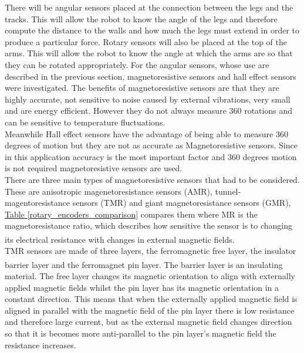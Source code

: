\documentclass[11pt]{article}		%
\newcommand{\supercite}[1]{\textsuperscript{\cite{#1}}}		%
\newcommand{\tableref}[1]{\hyperref[#1]{Table \ref*{#1}}}     %
\begin{document}
            There will be angular sensors placed at the connection between the legs and the tracks. 
            This will allow the robot to know the angle of the legs and therefore compute the distance to the walls and how much the legs must extend in order to produce a particular force. 
            Rotary sensors will also be placed at the top of the arms. 
            This will allow the robot to know the angle at which the arms are so that they can be rotated appropriately. 
            For the angular sensors, whose use are described in the previous section, magnetoresistive sensors and hall effect sensors were investigated. 
            The benefits of magnetoresistive sensors are that they are highly accurate, not sensitive to noise caused by external vibrations, very small and are energy efficient.
            However they do not always measure 360 rotations and can be sensitive to temperature fluctuations. 
            \\
            Meanwhile Hall effect sensors have the advantage of being able to measure 360 degrees of motion but they are not as accurate as Magnetoresistive sensors. 
            Since in this application accuracy is the most important factor and 360 degrees motion is not required magnetoresistive sensors are used.
            \\
            There are three main types of magnetoresistive sensors that had to be considered.
            These are anisotropic magenetoresistance sensors (AMR), tunnel-magentoresistance sensors (TMR) and giant magnetoresistance sensors (GMR),
            \tableref{rotary_encoders_comparison} compares them where MR is the magnetoresistance ratio, which describes how sensitive the sensor is to changing its electrical resistance with changes in external magnetic fields.\supercite{magnetoresistance}
            \\
            TMR sensors are made of three layers, the ferromagnetic free layer, the insulator barrier layer and the ferromagnet pin layer.\supercite{Tunnel_magnetoresistance} 
            The barrier layer is an insulating material.
            The free layer changes its magnetic orientation to align with externally applied magnetic fields whilst the pin layer has its magnetic orientation in a constant direction.
            This means that when the externally applied magnetic field is aligned in parallel with the magnetic field of the pin layer there is low resistance and therefore large current, but as the external magnetic field changes direction so that it is becomes more anti-parallel to the pin layer’s magnetic field the resistance increases. 
\end{document}
